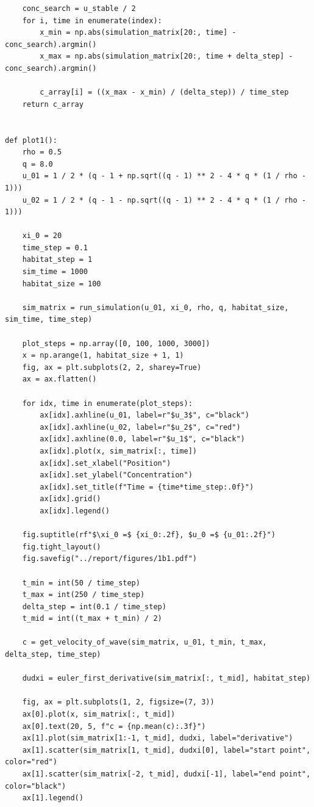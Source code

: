 \documentclass[15pt]{article}
\begin{document}
\begin{verbatim}
    conc_search = u_stable / 2
    for i, time in enumerate(index):
        x_min = np.abs(simulation_matrix[20:, time] - conc_search).argmin()
        x_max = np.abs(simulation_matrix[20:, time + delta_step] - conc_search).argmin()

        c_array[i] = ((x_max - x_min) / (delta_step)) / time_step
    return c_array


def plot1():
    rho = 0.5
    q = 8.0
    u_01 = 1 / 2 * (q - 1 + np.sqrt((q - 1) ** 2 - 4 * q * (1 / rho - 1)))
    u_02 = 1 / 2 * (q - 1 - np.sqrt((q - 1) ** 2 - 4 * q * (1 / rho - 1)))

    xi_0 = 20
    time_step = 0.1
    habitat_step = 1
    sim_time = 1000
    habitat_size = 100

    sim_matrix = run_simulation(u_01, xi_0, rho, q, habitat_size, sim_time, time_step)

    plot_steps = np.array([0, 100, 1000, 3000])
    x = np.arange(1, habitat_size + 1, 1)
    fig, ax = plt.subplots(2, 2, sharey=True)
    ax = ax.flatten()

    for idx, time in enumerate(plot_steps):
        ax[idx].axhline(u_01, label=r"$u_3$", c="black")
        ax[idx].axhline(u_02, label=r"$u_2$", c="red")
        ax[idx].axhline(0.0, label=r"$u_1$", c="black")
        ax[idx].plot(x, sim_matrix[:, time])
        ax[idx].set_xlabel("Position")
        ax[idx].set_ylabel("Concentration")
        ax[idx].set_title(f"Time = {time*time_step:.0f}")
        ax[idx].grid()
        ax[idx].legend()

    fig.suptitle(rf"$\xi_0 =$ {xi_0:.2f}, $u_0 =$ {u_01:.2f}")
    fig.tight_layout()
    fig.savefig("../report/figures/1b1.pdf")

    t_min = int(50 / time_step)
    t_max = int(250 / time_step)
    delta_step = int(0.1 / time_step)
    t_mid = int((t_max + t_min) / 2)

    c = get_velocity_of_wave(sim_matrix, u_01, t_min, t_max, delta_step, time_step)

    dudxi = euler_first_derivative(sim_matrix[:, t_mid], habitat_step)

    fig, ax = plt.subplots(1, 2, figsize=(7, 3))
    ax[0].plot(x, sim_matrix[:, t_mid])
    ax[0].text(20, 5, f"c = {np.mean(c):.3f}")
    ax[1].plot(sim_matrix[1:-1, t_mid], dudxi, label="derivative")
    ax[1].scatter(sim_matrix[1, t_mid], dudxi[0], label="start point", color="red")
    ax[1].scatter(sim_matrix[-2, t_mid], dudxi[-1], label="end point", color="black")
    ax[1].legend()


\end{verbatim}
\end{document}
